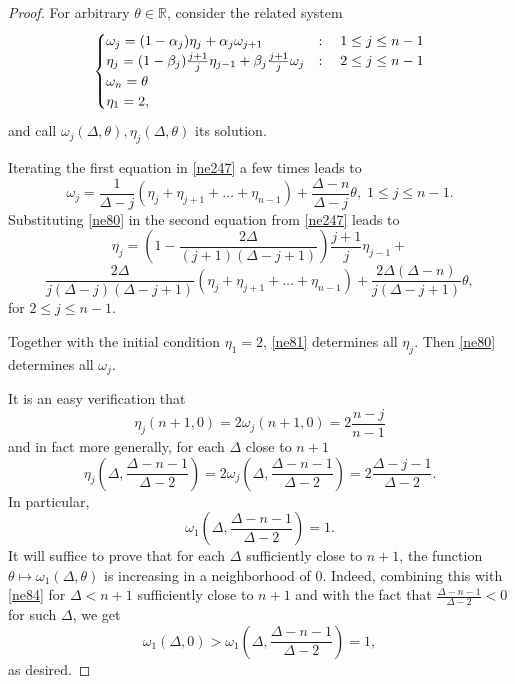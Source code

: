 \documentclass[amssymb,amsfonts,12pt]{amsart}
\def\R{{\mathbb R}}
\begin{document}
\begin{proof}
For arbitrary $\theta\in\R$, consider the related system
\begin{equation}
\label{ne247}
\begin{cases}\omega_j=(1-\alpha_j)\eta_j+\alpha_j\omega_{j+1}&:\quad 1\le j\le n-1\\ \hfill \eta_j=(1-\beta_j)\frac{j+1}{j}\eta_{j-1}+\beta_j\frac{j+1}{j}\omega_{j}&:\quad 2\le j\le n-1 \\  \omega_n=\theta\\\eta_1=2,\end{cases}
\end{equation}
and call $\omega_j(\Delta,\theta),\eta_j(\Delta,\theta)$ its solution.

Iterating the first equation in \eqref{ne247} a few times leads to
\begin{equation}
\label{ne80}
\omega_j=\frac1{\Delta-j}(\eta_j+\eta_{j+1}+\ldots+\eta_{n-1})+\frac{\Delta-n}{\Delta-j}\theta,\;1\le j\le n-1.
\end{equation}
Substituting \eqref{ne80} in the second equation from \eqref{ne247} leads to
\begin{equation}
\label{ne81}
\eta_j= (1-\frac{2\Delta}{(j+1)(\Delta-j+1)})\frac{j+1}{j}\eta_{j-1}+
\end{equation}
$$\frac{2\Delta}{j(\Delta-j)(\Delta-j+1)}(\eta_j+\eta_{j+1}+\ldots+\eta_{n-1})+\frac{2\Delta(\Delta-n)}{j(\Delta-j+1)}\theta,$$ for $2\le j\le n-1.$

Together with the initial condition $\eta_1=2$, \eqref{ne81} determines all $\eta_j$. Then \eqref{ne80} determines all $\omega_j$.

It is an easy verification that
\begin{equation}
\label{ne82}
\eta_j(n+1,0)=2\omega_j(n+1,0)=2\frac{n-j}{n-1}
\end{equation}
and in fact more generally, for each $\Delta$ close to $n+1$
\begin{equation}
\label{ne83}
\eta_j(\Delta,\frac{\Delta-n-1}{\Delta-2})=2\omega_j(\Delta,\frac{\Delta-n-1}{\Delta-2})=2\frac{\Delta-j-1}{\Delta-2}.
\end{equation}
In particular,
\begin{equation}
\label{ne84}
\omega_1(\Delta,\frac{\Delta-n-1}{\Delta-2})=1.
\end{equation}
It will suffice to prove that for each $\Delta$ sufficiently close to $n+1$, the function $\theta\mapsto\omega_1(\Delta,\theta)$ is increasing in a neighborhood of 0. Indeed, combining this with \eqref{ne84} for $\Delta<n+1$ sufficiently close to $n+1$  and with the fact that $\frac{\Delta-n-1}{\Delta-2}<0$ for such $\Delta$, we get
$$\omega_1(\Delta,0)>\omega_1(\Delta,\frac{\Delta-n-1}{\Delta-2})=1,$$
as desired.


\end{proof}
\end{document}

